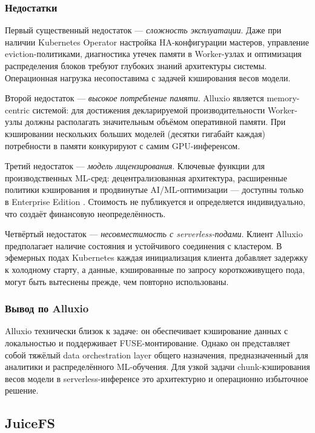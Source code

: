 \subsubsection*{Недостатки}

Первый существенный недостаток --- \textit{сложность эксплуатации}. Даже при наличии Kubernetes Operator настройка HA-конфигурации мастеров, управление eviction-политиками, диагностика утечек памяти в Worker-узлах и оптимизация распределения блоков требуют глубоких знаний архитектуры системы. Операционная нагрузка несопоставима с задачей кэширования весов модели.

Второй недостаток --- \textit{высокое потребление памяти}. Alluxio является memory-centric системой: для достижения декларируемой производительности Worker-узлы должны располагать значительным объёмом оперативной памяти. При кэшировании нескольких больших моделей (десятки гигабайт каждая) потребности в памяти конкурируют с самим GPU-инференсом.

Третий недостаток --- \textit{модель лицензирования}. Ключевые функции для производственных ML-сред: децентрализованная архитектура, расширенные политики кэширования и продвинутые AI/ML-оптимизации --- доступны только в Enterprise Edition \cite{alluxio_pricing}. Стоимость не публикуется и определяется индивидуально, что создаёт финансовую неопределённость.

Четвёртый недостаток --- \textit{несовместимость с serverless-подами}. Клиент Alluxio предполагает наличие состояния и устойчивого соединения с кластером. В эфемерных подах Kubernetes каждая инициализация клиента добавляет задержку к холодному старту, а данные, кэшированные по запросу короткоживущего пода, могут быть вытеснены прежде, чем повторно использованы.

\subsubsection*{Вывод по Alluxio}

Alluxio технически близок к задаче: он обеспечивает кэширование данных с локальностью и поддерживает FUSE-монтирование. Однако он представляет собой тяжёлый data orchestration layer общего назначения, предназначенный для аналитики и распределённого ML-обучения. Для узкой задачи chunk-кэширования весов модели в serverless-инференсе это архитектурно и операционно избыточное решение.

\subsection{JuiceFS}
\label{sec:juicefs}


